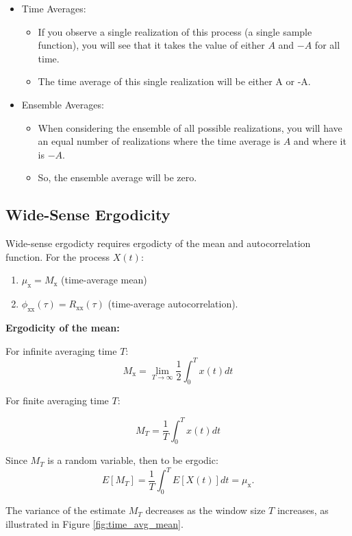 \documentclass[12pt]{book}
\theoremstyle{definition}
\begin{document}
\begin{itemize}
    \item Time Averages: 
    \begin{itemize}
        \item If you observe a single realization of this process (a single sample function), you will see that it takes the value of either \(A\) and \(-A\) for all time.
        \item The time average of this single realization will be either A or -A.
    \end{itemize}
    \item Ensemble Averages:
    \begin{itemize}
        \item When considering the ensemble of all possible realizations, you will have an equal number of realizations where the time average is \(A\) and where it is \(-A\).
        \item So, the ensemble average will be zero.
    \end{itemize}

\end{itemize}


\subsection{Wide-Sense Ergodicity}

Wide-sense ergodicty requires ergodicty of the mean and autocorrelation function. For the process $X(t)$:

\begin{enumerate}
    \item $\mu_\mathrm{x} = M_\mathrm{x}$ (time-average mean)
    \item $\phi_\mathrm{xx}(\tau) = R_\mathrm{xx}(\tau)$ (time-average autocorrelation).
\end{enumerate}


\textbf{Ergodicity of the mean:}

For infinite averaging time \(T\):
\[
M_\mathrm{x} = \lim_{T \to \infty} \frac{1}{2} \int_{0}^{T} x(t) dt
\]

For finite averaging time \(T\):

\[
M_T =  \frac{1}{T} \int_{0}^{T} x(t) dt
\]

Since \(M_T\) is a random variable, then to be ergodic:
\[
E[M_T] = \frac{1}{T} \int_{0}^{T} E[X(t)] dt = \mu_\mathrm{x}.
\]

The variance of the estimate \(M_T\) decreases as the window size \(T\) increases, as illustrated in Figure \ref{fig:time_avg_mean}.
\end{document}

